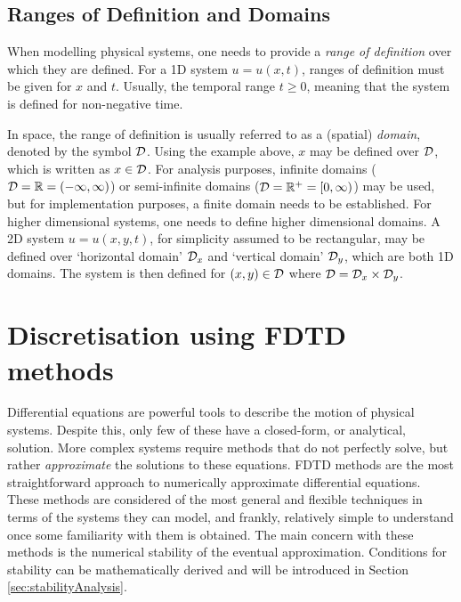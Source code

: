 
\subsection{Ranges of Definition and Domains}\label{sec:domains}
When modelling physical systems, one needs to provide a \textit{range of definition} over which they are defined. For a 1D system $u = u(x,t)$, ranges of definition must be given for $x$ and $t$. Usually, the temporal range $t\geq 0$, meaning that the system is defined for non-negative time. 

In space, the range of definition is usually referred to as a (spatial) \textit{domain}, denoted by the symbol $\mathcal{D}$. Using the example above, $x$ may be defined over $\mathcal{D}$, which is written as $x\in \mathcal{D}$. For analysis purposes, infinite domains ($\mathcal{D} = \mathbb{R} = (-\infty, \infty)$) or semi-infinite domains ($\mathcal{D} = \mathbb{R}^+ = [0, \infty)$) may be used, but for implementation purposes, a finite domain needs to be established. For higher dimensional systems, one needs to define higher dimensional domains. A 2D system $u=u(x,y,t)$, for simplicity assumed to be rectangular, may be defined over `horizontal domain' $\mathcal{D}_x$ and `vertical domain' $\mathcal{D}_y$, which are both 1D domains. The system is then defined for $(x,y)\in \mathcal{D}$ where $\mathcal{D} = \mathcal{D}_x\times \mathcal{D}_y$. 

\section{Discretisation using FDTD methods}\label{sec:discUsingFDTD}
Differential equations are powerful tools to describe the motion of physical systems. Despite this, only few of these have a closed-form, or analytical, solution. More complex systems require methods that do not perfectly solve, but rather \textit{approximate} the solutions to these equations. FDTD methods are the most straightforward approach to numerically approximate differential equations. These methods are considered of the most general and flexible techniques in terms of the systems they can model, and frankly, relatively simple to understand once some familiarity with them is obtained. The main concern with these methods is the numerical stability of the eventual approximation. Conditions for stability can be mathematically derived and will be introduced in Section \ref{sec:stabilityAnalysis}.

